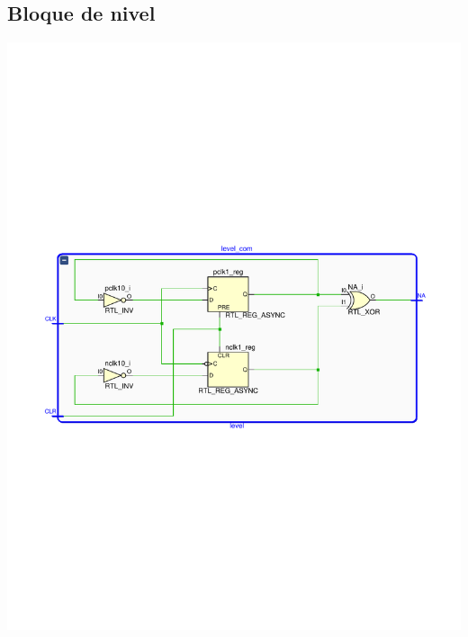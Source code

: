 \documentclass[8pt,executivepaper]{article}
\begin{document}
\subsection{Bloque de nivel}
\begin{center}
  \includegraphics[scale=0.75]{rtl/nivel.pdf}
\end{center}
\end{document}
